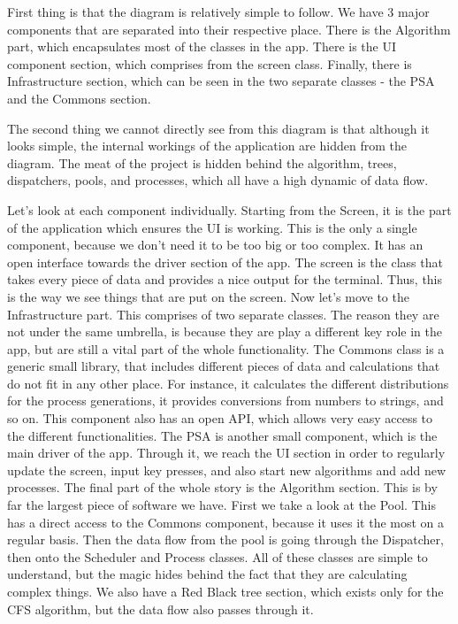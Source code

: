 \documentclass{article}
\begin{document}
First thing is that the diagram is relatively simple to follow. We have 3 major components that are separated into their respective place. There is the Algorithm part, which encapsulates most of the classes in the app. There is the UI component section, which comprises from the screen class. Finally, there is Infrastructure section, which can be seen in the two separate classes - the PSA and the Commons section.

The second thing we cannot directly see from this diagram is that although it looks simple, the internal workings of the application are hidden from the diagram. The meat of the project is hidden behind the algorithm, trees, dispatchers, pools, and processes, which all have a high dynamic of data flow.

Let's look at each component individually. Starting from the Screen, it is the part of the application which ensures the UI is working. This is the only a single component, because we don't need it to be too big or too complex. It has an open interface towards the driver section of the app. The screen is the class that takes every piece of data and provides a nice output for the terminal. Thus, this is the way we see things that are put on the screen. Now let's move to the Infrastructure part. This comprises of two separate classes. The reason they are not under the same umbrella, is because they are play a different key role in the app, but are still a vital part of the whole functionality. The Commons class is a generic small library, that includes different pieces of data and calculations that do not fit in any other place. For instance, it calculates the different distributions for the process generations, it provides conversions from numbers to strings, and so on. This component also has an open API, which allows very easy access to the different functionalities. The PSA is another small component, which is the main driver of the app. Through it, we reach the UI section in order to regularly update the screen, input key presses, and also start new algorithms and add new processes. The final part of the whole story is the Algorithm section. This is by far the largest piece of software we have. First we take a look at the Pool. This has a direct access to the Commons component, because it uses it the most on a regular basis. Then the data flow from the pool is going through the Dispatcher, then onto the Scheduler and Process classes. All of these classes are simple to understand, but the magic hides behind the fact that they are calculating complex things. We also have a Red Black tree section, which exists only for the CFS algorithm, but the data flow also passes through it.
\end{document}
